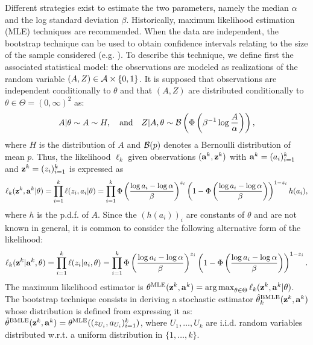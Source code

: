 Different strategies exist to estimate the two parameters, namely the median $\alpha$ and the log standard deviation $\beta$. Historically, maximum likelihood estimation (MLE) techniques are recommended.  %
When the data are independent, the bootstrap technique can be used to obtain confidence intervals relating to the size of the sample considered (e.g. \cite{shinozuka_statistical_2000,zentner_numerical_2010,wang_influence_2020}). %
To describe this technique,
we define first the associated statistical model: the observations are modeled as realizations of the random variable $(A,Z)\in\mathcal{A}\times\{0,1\}$. It is supposed that observations are independent conditionally to $\theta$ and that $(A,Z)$ are distributed conditionally to $\theta\in\Theta=(0,\infty)^2$ as:
    \begin{equation}
            A|\theta\sim A\sim H,\quad\text{and}\quad Z|A,\theta\sim\mathcal{B}\left(\Phi\left(\beta^{-1}\log\frac{A}{\alpha}\right)\right),
    \end{equation}
where $H$ is the distribution of $A$ and $\mathcal{B}(p)$ denotes a Bernoulli distribution of mean  $p$.
Thus, the likelihood $\ell_k$ given observations $(\mathbf{a}^k,\mathbf{z}^k)$ with $\mathbf{a}^k=(a_i)_{i=1}^k$ and $\mathbf{z}^k=(z_i)_{i=1}^{k}$ is expressed as
    \begin{equation}
        \ell_k(\mathbf{z}^k,\mathbf{a}^k|\theta) = \prod_{i=1}^k\ell(z_i,a_i|\theta) = \prod_{i=1}^k\Phi\left(\frac{\log a_i-\log\alpha}{\beta}\right)^{z_i}\left(1-\Phi\left(\frac{\log a_i-\log\alpha}{\beta}\right)\right)^{1-z_i}h(a_i),
    \end{equation}
where $h$ is the p.d.f. of $A$. Since the $(h(a_i))_i$ are constants of $\theta$ and are not known in general, it is common to consider the following alternative form of the likelihood:
\begin{equation}
    \ell_k(\mathbf{z}^k|\mathbf{a}^k,\theta) = \prod_{i=1}^k\ell(z_i|a_i,\theta) = \prod_{i=1}^k\Phi\left(\frac{\log a_i-\log\alpha}{\beta}\right)^{z_i}\left(1-\Phi\left(\frac{\log a_i-\log\alpha}{\beta}\right)\right)^{1-z_i}.
\end{equation}
The maximum likelihood estimator is $\theta^{\text{MLE}}(\mathbf{z}^k,\mathbf{a}^k)=\operatorname*{arg\,max}_{\theta\in\Theta}\ell_k(\mathbf{z}^k,\mathbf{a}^k|\theta)$.
The bootstrap technique consists in deriving a stochastic estimator $\hat\theta_k^{\text{BMLE}}(\mathbf{z}^k,\mathbf{a}^k)$ whose distribution is defined from expressing it as: $\hat\theta^{\text{BMLE}}(\mathbf{z}^k,\mathbf{a}^k)=\theta^{\text{MLE}}((z_{U_i},a_{U_i})_{i=1}^k)$, where $U_1,\dots,U_k$ are i.i.d. random variables distributed w.r.t. a uniform distribution in $\{1,\dots,k\}$.



